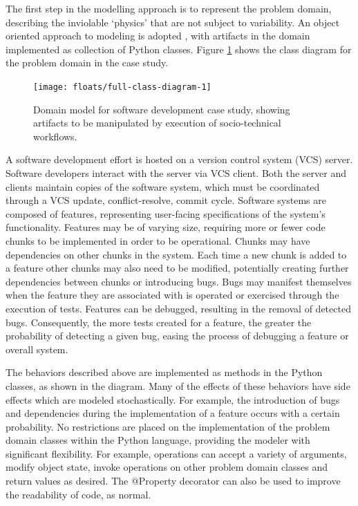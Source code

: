 \documentclass{llncs}
\begin{document}
The first step in the modelling approach is to represent the problem domain, describing the inviolable `physics' that
are not subject to variability. An object oriented approach to modeling is adopted \cite{bennett06object}, with
artifacts in the domain implemented as collection of Python classes.  Figure \ref{fig:domain} shows the class diagram
for the problem domain in the case study.

\begin{figure}[t]
  \centering
  \texttt{[image: floats/full-class-diagram-1]}
  \caption{Domain model for software development case study, showing artifacts to be manipulated by execution of
    socio-technical workflows.}
  \label{fig:domain}
\end{figure}

A software development effort is hosted on a version control system (VCS) server.  Software developers interact with the
server via VCS client.  Both the server and clients maintain copies of the software system, which must be coordinated
through a VCS update, conflict-resolve, commit cycle.  Software systems are composed of features, representing
user-facing specifications of the system's functionality.  Features may be of varying size, requiring more or fewer code
chunks to be implemented in order to be operational.  Chunks may have dependencies on other chunks in the system.  Each
time a new chunk is added to a feature other chunks may also need to be modified, potentially creating further
dependencies between chunks or introducing bugs.  Bugs may manifest themselves when the feature they are associated with
is operated or exercised through the execution of tests.  Features can be debugged, resulting in the removal of detected
bugs.  Consequently, the more tests created for a feature, the greater the probability of detecting a given bug, easing
the process of debugging a feature or overall system.

The behaviors described above are implemented as methods in the Python classes, as shown in the diagram.  Many of the
effects of these behaviors have side effects which are modeled stochastically. For example, the introduction of bugs and
dependencies during the implementation of a feature occurs with a certain probability. No restrictions are placed on the
implementation of the problem domain classes within the Python language, providing the modeler with significant
flexibility.  For example, operations can accept a variety of arguments, modify object state, invoke operations on other
problem domain classes and return values as desired. The @Property decorator can also be used to improve the readability
of code, as normal.
\end{document}
